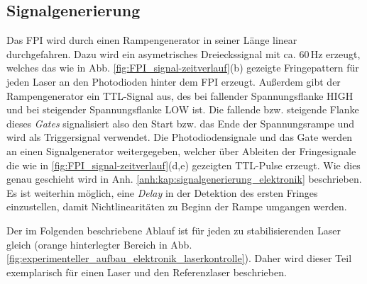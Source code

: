 \subsection{Signalgenerierung}\label{subsec:signalgenerierung}
Das FPI wird durch einen Rampengenerator in seiner Länge linear durchgefahren.
Dazu wird ein asymetrisches Dreieckssignal mit ca. $60\,$Hz erzeugt, welches das
wie in Abb.
\ref{fig:FPI_signal-zeitverlauf}(b) gezeigte Fringepattern für jeden Laser
an den Photodioden hinter dem FPI erzeugt. Außerdem gibt der Rampengenerator
ein TTL-Signal aus, des bei fallender Spannungsflanke HIGH und bei
steigender Spannungsflanke LOW ist. Die fallende bzw. steigende Flanke dieses
\textit{Gates} signalisiert also den Start bzw. das Ende der Spannungsrampe
und wird als Triggersignal verwendet. Die Photodiodensignale und das
Gate werden an einen Signalgenerator weitergegeben, welcher über Ableiten der
Fringesignale die wie in \ref{fig:FPI_signal-zeitverlauf}(d,e) gezeigten TTL-Pulse erzeugt.
Wie dies genau geschieht wird in Anh.
\ref{anh:kap:signalgenerierung_elektronik} beschrieben. Es ist weiterhin
möglich, eine \textit{Delay} in der Detektion des ersten Fringes einzustellen,
damit Nichtlinearitäten zu Beginn der Rampe umgangen werden.\par
Der im Folgenden beschriebene Ablauf ist für jeden zu stabilisierenden Laser
gleich (orange hinterlegter Bereich in Abb.
\ref{fig:experimenteller_aufbau_elektronik_laserkontrolle}). Daher wird dieser
Teil exemplarisch für einen Laser und den Referenzlaser beschrieben.

